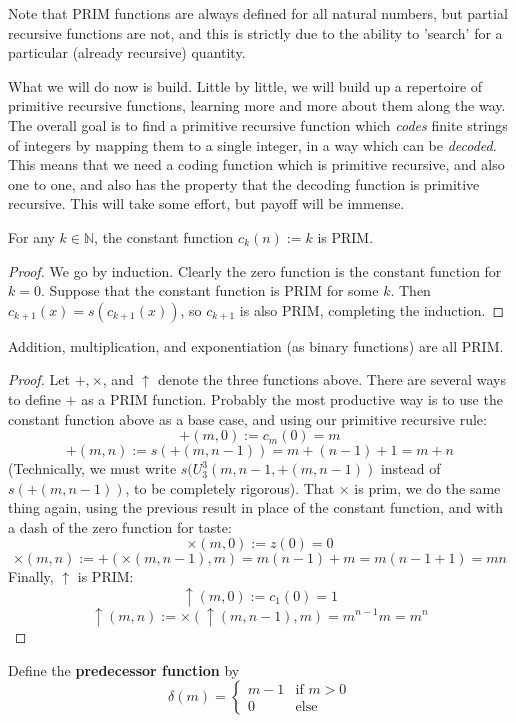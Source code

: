 Note that PRIM functions are always defined for all natural numbers, but partial recursive functions are not, and this is strictly due to the ability to 'search' for a particular (already recursive) quantity.
\par What we will do now is build. Little by little, we will build up a repertoire of primitive recursive functions, learning more and more about them along the way. The overall goal is to find a primitive recursive function which \textit{codes} finite strings of integers by mapping them to a single integer, in a way which can be \textit{decoded}. This means that we need a coding function which is primitive recursive, and also one to one, and also has the property that the decoding function is primitive recursive. This will take some effort, but payoff will be immense.
\begin{lemma}
    For any $k \in \mathbb{N}$, the constant function $c_k(n):=k$ is PRIM.
\end{lemma}
\begin{proof}
    We go by induction. Clearly the zero function is the constant function for $k=0$. Suppose that the constant function is PRIM for some $k$. Then $c_{k+1}(x)=s(c_{k+1}(x))$, so $c_{k+1}$ is also PRIM, completing the induction.
\end{proof}
\begin{lemma}
    Addition, multiplication, and exponentiation (as binary functions) are all PRIM. 
\end{lemma}
\begin{proof}
    Let $+,\times$, and $\uparrow$ denote the three functions above. There are several ways to define $+$ as a PRIM function. Probably the most productive way is to use the constant function above as a base case, and using our primitive recursive rule: 
    \[+(m,0) := c_m(0) = m\]
    \[+(m,n) := s(+(m,n-1))=m+(n-1)+1=m+n\]
    (Technically, we must write $s(U_3^3(m,n-1,+(m,n-1))$ instead of $s(+(m,n-1))$, to be completely rigorous). That $\times$ is prim, we do the same thing again, using the previous result in place of the constant function, and with a dash of the zero function for taste:
    \[\times(m,0) := z(0) = 0 \]
    \[\times(m,n) := +(\times(m,n-1),m) = m(n-1)+m = m(n-1+1) = mn \]
    Finally, $\uparrow$ is PRIM:
    \[ \uparrow(m,0) := c_1(0) = 1 \]
    \[ \uparrow(m,n) := \times(\uparrow (m,n-1),m) = m^{n-1}m = m^n \]
\end{proof}
Define the \textbf{predecessor function} by 
\[
    \delta(m) = \begin{cases}
                    m-1 & \textrm{if $m>0$} \\
                    0 & \textrm{else}
                \end{cases}
\]
